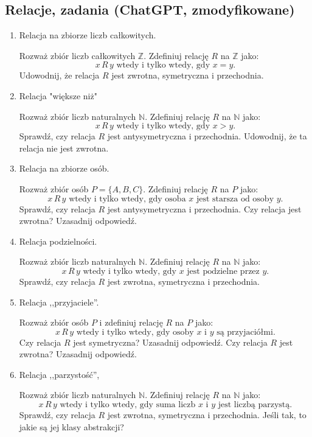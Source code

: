 \documentclass[12pt]{article}
\begin{document}
\subsection{Relacje, zadania (ChatGPT, zmodyfikowane)}
\begin{enumerate} 

\item 
Relacja na zbiorze liczb całkowitych.

Rozważ zbiór liczb całkowitych $\mathbb{Z}$. Zdefiniuj relację $R$ na $\mathbb{Z}$ jako: 
\[
x \, R \, y \text{ wtedy i tylko wtedy, gdy } x = y.
\]
Udowodnij, że relacja $R$ jest zwrotna, symetryczna i przechodnia.

\item 
Relacja "większe niż"

Rozważ zbiór liczb naturalnych $ \mathbb{N} $. Zdefiniuj relację $ R $ na $ \mathbb{N} $ jako:
\[
x \, R \, y \text{ wtedy i tylko wtedy, gdy } x > y.
\]
Sprawdź, czy relacja $ R $ jest antysymetryczna i przechodnia.
Udowodnij, że ta relacja nie jest zwrotna.

\item
Relacja na zbiorze osób.

Rozważ zbiór osób $ P = \{A, B, C\} $. Zdefiniuj relację $ R $ na $ P $ jako:
\[
x \, R \, y \text{ wtedy i tylko wtedy, gdy osoba } x \text{ jest starsza od osoby } y.
\]
Sprawdź, czy relacja $ R $ jest antysymetryczna i przechodnia.
Czy relacja jest zwrotna? Uzasadnij odpowiedź.

\item
Relacja podzielności.

Rozważ zbiór liczb naturalnych $ \mathbb{N} $. Zdefiniuj relację $ R $ na $ \mathbb{N} $ jako:
\[
x \, R \, y \text{ wtedy i tylko wtedy, gdy } x \text{ jest podzielne przez } y.
\]
Sprawdź, czy relacja $ R $ jest zwrotna, symetryczna i przechodnia.

\item 
Relacja ,,przyjaciele''.

Rozważ zbiór osób $ P $ i zdefiniuj relację $ R $ na $ P $ jako:
\[
x \, R \, y \text{ wtedy i tylko wtedy, gdy osoby } x \text{ i } y \text{ są przyjaciółmi}.
\]
Czy relacja $ R $ jest symetryczna? Uzasadnij odpowiedź.
Czy relacja $ R $ jest zwrotna? Uzasadnij odpowiedź.

\item 
Relacja ,,parzystość'',

Rozważ zbiór liczb naturalnych $ \mathbb{N} $. Zdefiniuj relację $ R $ na $ \mathbb{N} $ jako:
\[
x \, R \, y \text{ wtedy i tylko wtedy, gdy suma liczb } x \text{ i } y \text{ jest liczbą parzystą.}
\]
Sprawdź, czy relacja $ R $ jest zwrotna, symetryczna i przechodnia.
Jeśli tak, to jakie są jej klasy abstrakcji?


\end{enumerate}
\end{document}
